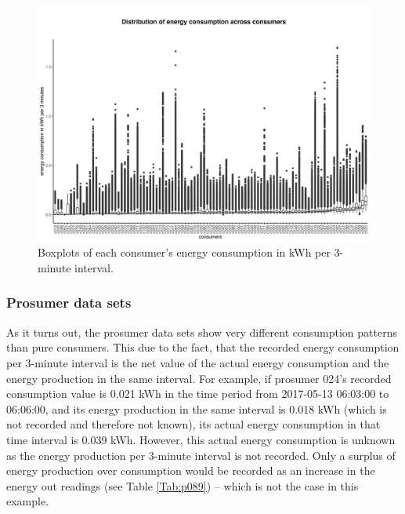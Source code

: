 \begin{figure}[htbp]
 \centering
\includegraphics[width=\textwidth]{thesis/graphs/consumer_boxplots_consumption.jpg}
\caption[Boxplots of each consumer's energy consumption in kWh per 3-minute interval]{Boxplots of each consumer's energy consumption in kWh per 3-minute interval. \quantnet}
\label{Fig:cons_boxplots_consumption}
\end{figure}

\subsubsection{Prosumer data sets}

As it turns out, the prosumer data sets show very different consumption patterns than pure consumers. This due to the fact, that the recorded energy consumption per 3-minute interval is the net value of the actual energy consumption and the energy production in the same interval. For example, if prosumer 024's recorded consumption value is 0.021 kWh in the time period from 2017-05-13 06:03:00 to 06:06:00, and its energy production in the same interval is 0.018 kWh (which is not recorded and therefore not known), its actual energy consumption in that time interval is 0.039 kWh. However, this actual energy consumption is unknown as the energy production per 3-minute interval is not recorded. Only a surplus of energy production over consumption would be recorded as an increase in the energy out readings (see Table \ref{Tab:p089}) -- which is not the case in this example.

